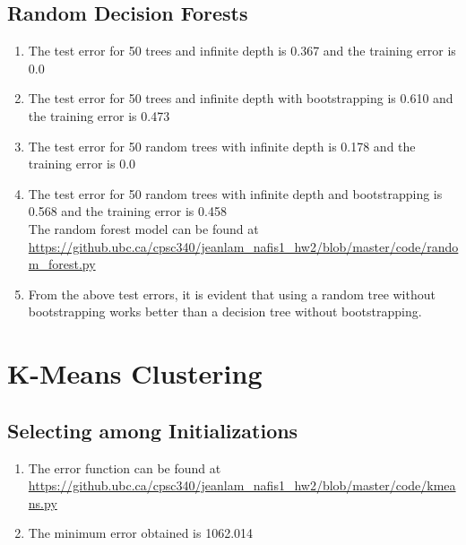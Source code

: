 \documentclass{article}
\begin{document}
\subsection{Random Decision Forests}
\begin{enumerate}
\item The test error for 50 trees and infinite depth is 0.367 and the training error is 0.0
\item The test error for 50 trees and infinite depth with bootstrapping is 0.610 and the training error is 0.473
\item The test error for 50 random trees with infinite depth is 0.178 and the training error is 0.0
\item The test error for 50 random trees with infinite depth and bootstrapping is 0.568 and the training error is 0.458 \\
The random forest model can be found at \url{https://github.ubc.ca/cpsc340/jeanlam_nafis1_hw2/blob/master/code/random_forest.py}
\item From the above test errors, it is evident that using a random tree without bootstrapping works better than a decision tree without bootstrapping. 
\end{enumerate}

\section{K-Means Clustering}
\subsection{Selecting among Initializations}
\begin{enumerate}
\item The error function can be found at \url{https://github.ubc.ca/cpsc340/jeanlam_nafis1_hw2/blob/master/code/kmeans.py}
\item {} The minimum error obtained is 1062.014
\end{enumerate}
\end{document}

